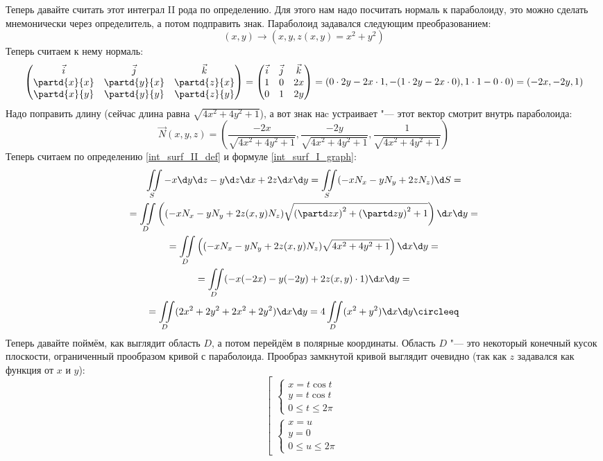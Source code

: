 	Теперь давайте считать этот интеграл II рода по определению.
	Для этого нам надо посчитать нормаль к параболоиду, это можно сделать мнемонически через определитель,
	а потом подправить знак.
	Параболоид задавался следующим преобразованием:
	\[ (x, y) \to (x, y, z(x, y) = x^2+y^2) \]
	Теперь считаем к нему нормаль:
	\begin{gather*}
		\begin{pmatrix}
			\vec i & \vec j & \vec k \\
			\partd{x}{x} & \partd{y}{x} & \partd{z}{x} \\
			\partd{x}{y} & \partd{y}{y} & \partd{z}{y}
		\end{pmatrix}
		=
		\begin{pmatrix}
			\vec i & \vec j & \vec k \\
			1 & 0 & 2x \\
			0 & 1 & 2y
		\end{pmatrix}
		= (0\cdot2y - 2x\cdot 1, -(1\cdot2y-2x\cdot0), 1\cdot1 - 0\cdot 0)
		= (-2x, -2y, 1)
	\end{gather*}
	Надо поправить длину (сейчас длина равна $\sqrt{4x^2+4y^2+1}$), а вот знак наc устраивает "--- этот вектор смотрит внутрь параболоида:
	\[ \vec N(x, y, z) = \left(\frac{-2x}{\sqrt{4x^2+4y^2+1}}, \frac{-2y}{\sqrt{4x^2+4y^2+1}}, \frac{1}{\sqrt{4x^2+4y^2+1}}\right) \]
	Теперь считаем по определению \ref{int_surf_II_def} и формуле \ref{int_surf_I_graph}:
	\begin{gather*}
		\iint\limits_S -x\d y \d z - y\d z \d x + 2z \d x \d y =
		\iint\limits_S (-xN_x - yN_y + 2zN_z) \d S = \\
		= \iint\limits_D \left( (-xN_x - yN_y + 2z(x, y)N_z) \sqrt{\left(\partd z x\right)^2+\left(\partd z y\right)^2+1} \right) \d x \d y = \\
		= \iint\limits_D \left( (-xN_x - yN_y + 2z(x, y)N_z) \sqrt{4x^2+4y^2+1} \right) \d x \d y = \\
		= \iint\limits_D (-x(-2x) - y(-2y) + 2z(x, y) \cdot 1) \d x \d y = \\
		= \iint\limits_D (2x^2 + 2y^2 + 2x^2+2y^2) \d x \d y =
		4\iint\limits_D (x^2 + y^2) \d x \d y \circleeq
	\end{gather*}
	Теперь давайте поймём, как выглядит область $D$, а потом перейдём в полярные координаты.
	Область $D$ "--- это некоторый конечный кусок плоскости, ограниченный прообразом кривой с параболоида.
	Прообраз замкнутой кривой выглядит очевидно (так как $z$ задавался как функция от $x$ и $y$):
	\[
		\left[
			\begin{array}{l}
				\begin{cases}
					x = t \cos t \\
					y = t \cos t \\
					0 \le t \le 2\pi
				\end{cases} \\
				\begin{cases}
					x = u \\
					y = 0 \\
					0 \le u \le 2\pi 
				\end{cases}
			\end{array}
		\right.
	\]
